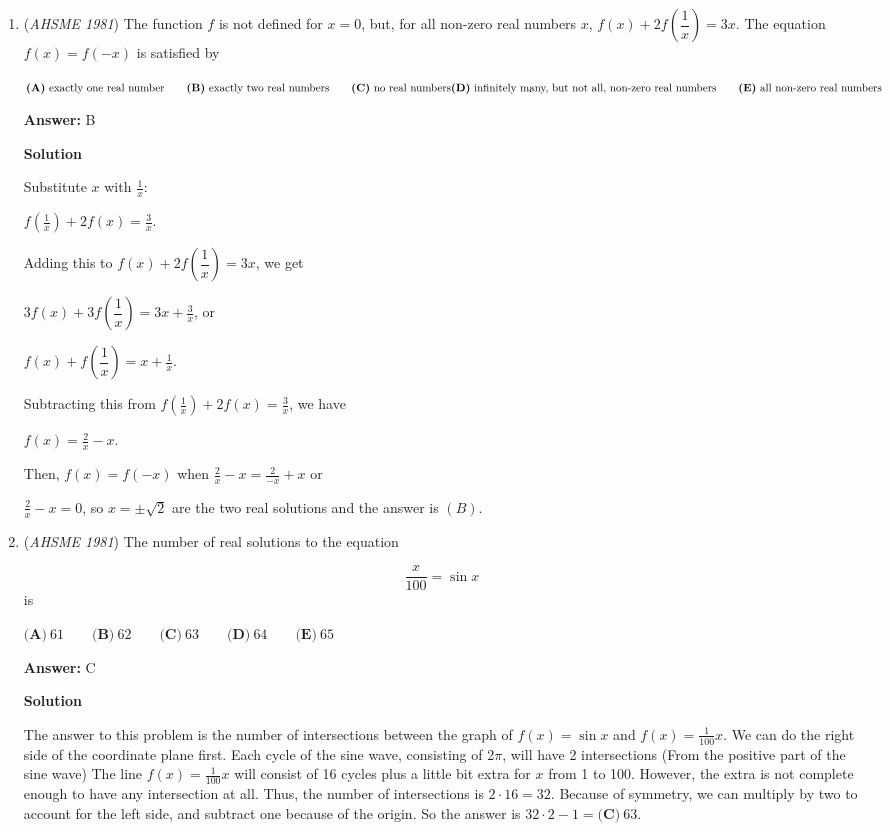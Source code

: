 \begin{enumerate}
	\item (\textit{AHSME 1981}) The function $f$ is not defined for $x=0$, but, for all non-zero real numbers $x$, $f(x)+2f\left(\dfrac{1}x\right)=3x$. The equation $f(x)=f(-x)$ is satisfied by


 $\textbf{(A)}\ \text{exactly one real number} \qquad \textbf{(B)}\ \text{exactly two real numbers} \qquad\textbf{(C)}\ \text{no real numbers}\qquad \\ \textbf{(D)}\ \text{infinitely many, but not all, non-zero real numbers} \qquad\textbf{(E)}\ \text{all non-zero real numbers}$

 \textbf{Answer: }B



\textbf{Solution}

Substitute $x$ with $\frac{1}{x}$:

 $f\left(\frac{1}{x}\right)+2f(x)=\frac{3}{x}$.

 Adding this to $f(x)+2f\left(\dfrac{1}x\right)=3x$, we get

 $3f(x)+3f\left(\dfrac{1}x\right)=3x+\frac{3}{x}$, or

 $f(x)+f\left(\dfrac{1}x\right)=x+\frac{1}{x}$.

 Subtracting this from $f(\frac{1}{x})+2f(x)=\frac{3}{x}$, we have

 $f(x)=\frac{2}{x}-x$.

 Then, $f(x)=f(-x)$ when $\frac{2}{x}-x=\frac{2}{-x}+x$ or

 $\frac{2}{x}-x=0$, so $x=\pm{\sqrt2}$ are the two real solutions and the answer is $\boxed{(B)}$.

 


	\item (\textit{AHSME 1981}) The number of real solutions to the equation

 \[\dfrac{x}{100}=\sin x\]
is


 $\textbf{(A)}\ 61\qquad\textbf{(B)}\ 62\qquad\textbf{(C)}\ 63\qquad\textbf{(D)}\ 64\qquad\textbf{(E)}\ 65$

 \textbf{Answer: }C



\textbf{Solution}

The answer to this problem is the number of intersections between the graph of $f(x) = \sin x$ and $f(x) = \frac{1}{100}x.$ We can do the right side of the coordinate plane first. Each cycle of the sine wave, consisting of 2$\pi$, will have 2 intersections (From the positive part of the sine wave) The line $f(x) = \frac{1}{100}x$ will consist of 16 cycles plus a little bit extra for $x$ from 1 to 100. However, the extra is not complete enough to have any intersection at all. Thus, the number of intersections is $2 \cdot 16 = 32.$ Because of symmetry, we can multiply by two to account for the left side, and subtract one because of the origin. So the answer is $32 \cdot 2 - 1 =  \textbf{(C)}\ 63.$


\end{enumerate}
